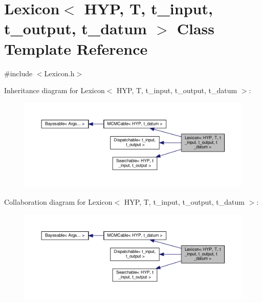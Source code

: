 \hypertarget{class_lexicon}{}\section{Lexicon$<$ H\+YP, T, t\+\_\+input, t\+\_\+output, t\+\_\+datum $>$ Class Template Reference}
\label{class_lexicon}


{\ttfamily \#include $<$Lexicon.\+h$>$}



Inheritance diagram for Lexicon$<$ H\+YP, T, t\+\_\+input, t\+\_\+output, t\+\_\+datum $>$\+:\nopagebreak
\begin{figure}[H]
\begin{center}
\leavevmode
\includegraphics[width=350pt]{class_lexicon__inherit__graph}
\end{center}
\end{figure}


Collaboration diagram for Lexicon$<$ H\+YP, T, t\+\_\+input, t\+\_\+output, t\+\_\+datum $>$\+:\nopagebreak
\begin{figure}[H]
\begin{center}
\leavevmode
\includegraphics[width=350pt]{class_lexicon__coll__graph}
\end{center}
\end{figure}

